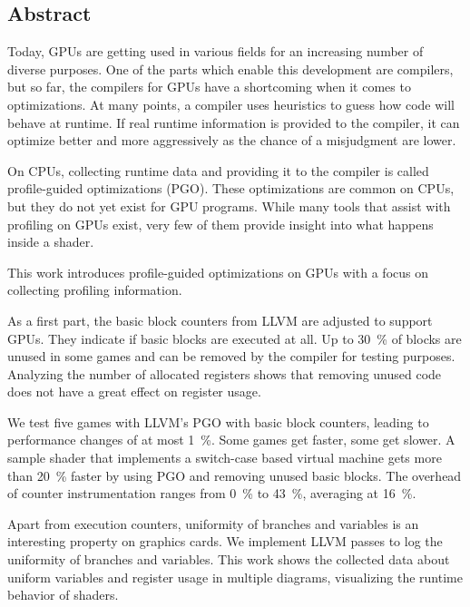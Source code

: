 \newpage
\vspace*{3.5cm}
\begin{center}
\begin{minipage}{12.5cm}
\section*{Abstract}
Today, GPUs are getting used in various fields for an increasing number of diverse purposes.
One of the parts which enable this development are compilers, but so far, the compilers for GPUs have a shortcoming when it comes to optimizations.
At many points, a compiler uses heuristics to guess how code will behave at runtime.
If real runtime information is provided to the compiler, it can optimize better and more aggressively as the chance of a misjudgment are lower.

On CPUs, collecting runtime data and providing it to the compiler is called profile-guided optimizations (PGO).
These optimizations are common on CPUs, but they do not yet exist for GPU programs.
While many tools that assist with profiling on GPUs exist, very few of them provide insight into what happens inside a shader.

This work introduces profile-guided optimizations on GPUs with a focus on collecting profiling information.

As a first part, the basic block counters from LLVM are adjusted to support GPUs.
They indicate if basic blocks are executed at all.
Up to \SI{30}{\percent} of blocks are unused in some games and can be removed by the compiler for testing purposes.
Analyzing the number of allocated registers shows that removing unused code does not have a great effect on register usage.

We test five games with LLVM's PGO with basic block counters, leading to performance changes of at most \SI{1}{\percent}.
Some games get faster, some get slower.
A sample shader that implements a switch-case based virtual machine gets more than \SI{20}{\percent} faster by using PGO and removing unused basic blocks.
The overhead of counter instrumentation ranges from \SI{0}{\percent} to \SI{43}{\percent}, averaging at \SI{16}{\percent}.

Apart from execution counters, uniformity of branches and variables is an interesting property on graphics cards.
We implement LLVM passes to log the uniformity of branches and variables.
This work shows the collected data about uniform variables and register usage in multiple diagrams, visualizing the runtime behavior of shaders.

\end{minipage}
\end{center}



